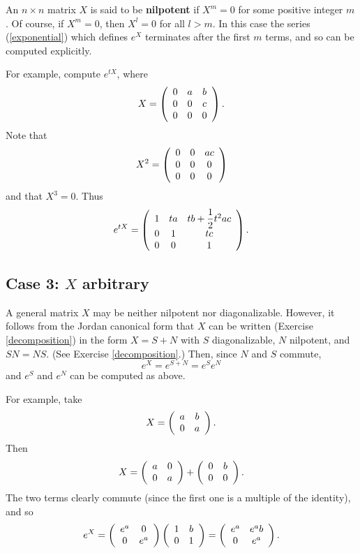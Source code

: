 \documentclass{amsbook}
\theoremstyle{plain}
\numberwithin{equation}{chapter}
\numberwithin{theorem}{chapter}
\begin{document}
An $n\times n$ matrix $X$ is said to be \textbf{nilpotent} if $X^{m}=0$ for
some positive integer $m$. Of course, if $X^{m}=0$, then $X^{l}=0$ for all
$l>m$. In this case the series (\ref{exponential}) which defines $e^{X}$
terminates after the first $m$ terms, and so can be computed explicitly.

For example, compute $e^{tX}$, where
\[
X=\left(
\begin{array}
[c]{ccc}%
0 & a & b\\
0 & 0 & c\\
0 & 0 & 0
\end{array}
\right)  \text{.}%
\]
Note that
\[
X^{2}=\left(
\begin{array}
[c]{ccc}%
0 & 0 & ac\\
0 & 0 & 0\\
0 & 0 & 0
\end{array}
\right)
\]
and that $X^{3}=0$. Thus
\[
e^{tX}=\left(
\begin{array}
[c]{ccc}%
1 & ta & tb+\dfrac12t^{2}ac\\
0 & 1 & tc\\
0 & 0 & 1
\end{array}
\right)  \text{.}%
\]

\subsection{Case 3: $X$ arbitrary}

A general matrix $X$ may be neither nilpotent nor diagonalizable. However, it
follows from the Jordan canonical form that $X$ can be written (Exercise
\ref{decomposition}) in the form $X=S+N$ with $S$ diagonalizable, $N$
nilpotent, and $SN=NS$. (See Exercise \ref{decomposition}.) Then, since $N$
and $S$ commute,
\[
e^{X}=e^{S+N}=e^{S}e^{N}%
\]
and $e^{S}$ and $e^{N}$ can be computed as above.

For example, take
\[
X=\left(
\begin{array}
[c]{cc}%
a & b\\
0 & a
\end{array}
\right)  \text{.}%
\]
Then
\[
X=\left(
\begin{array}
[c]{cc}%
a & 0\\
0 & a
\end{array}
\right)  +\left(
\begin{array}
[c]{cc}%
0 & b\\
0 & 0
\end{array}
\right)  \text{.}%
\]
The two terms clearly commute (since the first one is a multiple of the
identity), and so
\[
e^{X}=\left(
\begin{array}
[c]{cc}%
e^{a} & 0\\
0 & e^{a}%
\end{array}
\right)  \left(
\begin{array}
[c]{cc}%
1 & b\\
0 & 1
\end{array}
\right)  =\left(
\begin{array}
[c]{cc}%
e^{a} & e^{a}b\\
0 & e^{a}%
\end{array}
\right)  \text{.}%
\]
\end{document}
